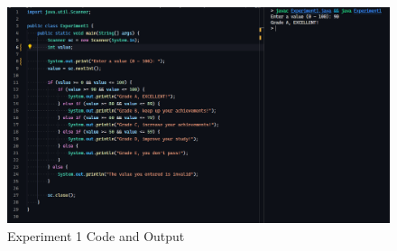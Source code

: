 \documentclass[12pt,titlepage]{article}
\begin{document}
\begin{enumerate}
{        \begin{figure}[h]
            \centering
            \includegraphics[width=\textwidth]{images/experiment1.png}
            \caption{Experiment 1 Code and Output}
        \end{figure}
    }
\end{enumerate}
\end{document}
